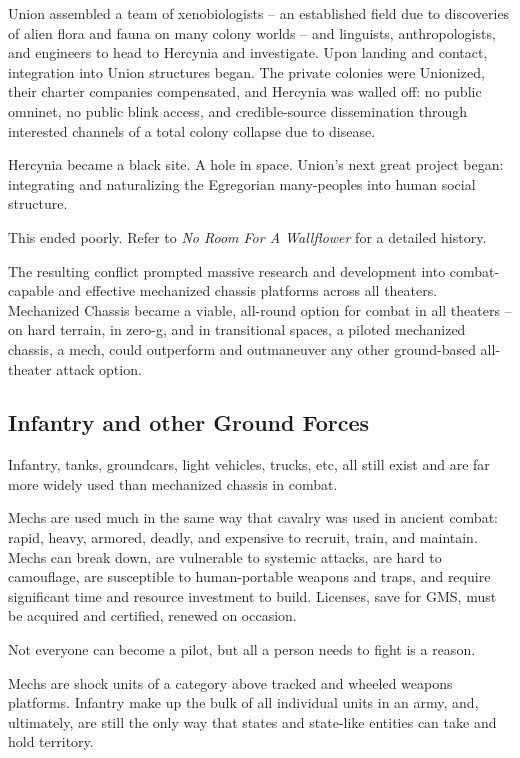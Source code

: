 Union assembled a team of xenobiologists -- an established field due to discoveries of alien flora
and fauna on many colony worlds -- and linguists, anthropologists, and engineers to head to
Hercynia and investigate. Upon landing and contact, integration into Union structures began. The
private colonies were Unionized, their charter companies compensated, and Hercynia was
walled off: no public omninet, no public blink access, and credible-source dissemination through
interested channels of a total colony collapse due to disease.

Hercynia became a black site. A hole in space. Union’s next great project began: integrating and
naturalizing the Egregorian many-peoples into human social structure.

This ended poorly. Refer to \textit{No Room For A Wallflower} for a detailed history.

The resulting conflict prompted massive research and development into combat-capable and
effective mechanized chassis platforms across all theaters. Mechanized Chassis became a
viable, all-round option for combat in all theaters -- on hard terrain, in zero-g, and in transitional
spaces, a piloted mechanized chassis, a mech, could outperform and outmaneuver any other
ground-based all-theater attack option.

\subsection{Infantry and other Ground Forces}

Infantry, tanks, groundcars, light vehicles, trucks, etc, all still exist and are far more widely used
than mechanized chassis in combat.

Mechs are used much in the same way that cavalry was used in ancient combat: rapid, heavy,
armored, deadly, and expensive to recruit, train, and maintain. Mechs can break down, are
vulnerable to systemic attacks, are hard to camouflage, are susceptible to human-portable
weapons and traps, and require significant time and resource investment to build. Licenses, save
for GMS, must be acquired and certified, renewed on occasion.

Not everyone can become a pilot, but all a person needs to fight is a reason.

Mechs are shock units of a category above tracked and wheeled weapons platforms. Infantry
make up the bulk of all individual units in an army, and, ultimately, are still the only way that
states and state-like entities can take and hold territory.

